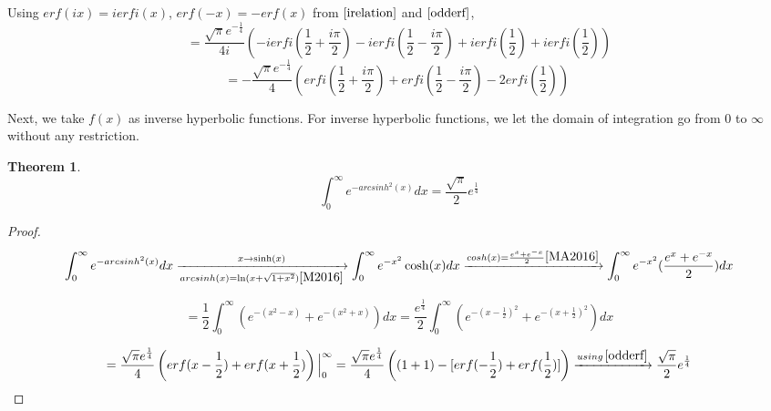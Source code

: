 \documentclass[a4paper,twoside,10pt]{article}
\newtheorem{theorem}{Theorem}[section]
\begin{document}
  Using $erf(ix) = ierfi(x)$, $erf(-x) = - erf(x)$ from $\eqref{irelation}$  and   $\eqref{odderf}$, 
\[  = \frac{\sqrt{\pi} e^{-\frac{1}{4}} }{4i}  \left( - i erfi(\frac{1}{2}+\frac{i \pi}{2}) -i erfi(\frac{1}{2}-\frac{i \pi}{2}) + ierfi(\frac{1}{2})+ierfi(\frac{1}{2})  \right)
\]
\[  = -\frac{\sqrt{\pi} e^{-\frac{1}{4}} }{4}  \left( erfi(\frac{1}{2}+\frac{i\pi}{2}) + erfi(\frac{1}{2}-\frac{i\pi}{2}) - 2  erfi(\frac{1}{2}) \right) \,\,  
\] 

Next, we take $f(x)$ as inverse hyperbolic functions. For inverse hyperbolic functions, we let the domain of integration go from 0 to   $\infty  $  without any restriction. 

 \begin{theorem}
\begin{equation}\label{arcsinheqn}
 \int_0^{\infty} e^{-arcsinh^2(x)} dx = \frac{\sqrt{\pi}}{2} e^{\frac{1}{4}}   
\end{equation}
\end{theorem}
\begin{proof}
\[ \int_0^{\infty} e^{-arcsinh^2(x)} dx \xrightarrow[arcsinh(x)=\ln(x+\sqrt{1+x^2}) \cite{M2016}]{x\rightarrow \sinh(x)} \int_0^{\infty} e^{-x^2} \cosh(x) dx \xrightarrow{cosh(x)=\frac{e^x+e^{-x}}{2} \cite{MA2016}}  \int_0^{\infty} e^{-x^2}(\frac{e^{x}+e^{-x}}{2}) dx  \]

\[=\frac{1}{2} \int_0^{ \infty} \left( e^{-(x^2-x)}+ e^{-(x^2+x)} \right) dx = \frac{e^{\frac{1}{4}}}{2} \int_0^{ \infty} \left( e^{-(x-\frac{1}{2})^2}+ e^{-(x+\frac{1}{2})^2} \right) dx \]

\[ =\frac{\sqrt{\pi}e^{\frac{1}{4}}}{4}  \left( erf(x-\frac{1}{2}) + erf(x+\frac{1}{2}) \right) \Big|_0^{\infty} = \frac{\sqrt{\pi} e^{\frac{1}{4}} }{4}  \left( (1+1)-[erf(-\frac{1}{2})+erf(\frac{1}{2})] \right) \xrightarrow{using \, \eqref{odderf}} \frac{\sqrt{\pi}}{2}e^{\frac{1}{4}}    \]
\end{proof}
\end{document}
